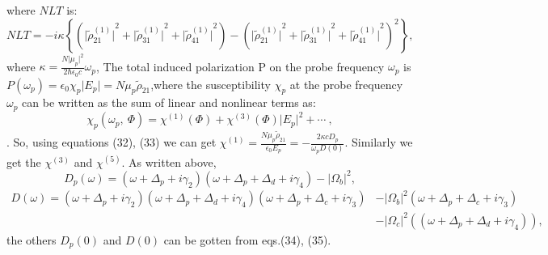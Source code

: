\documentclass[12pt,a4paper]{article}
\begin{document}
where \(NLT\) is:
\begin{equation}
      {NLT} =  {-i\kappa}{\left\lbrace{{\left({\vert\tilde\rho^{(1)}_{21}\vert}^{2}+{\vert\tilde\rho^{(1)}_{31}\vert}^{2}+{\vert\tilde\rho^{(1)}_{41}\vert}^{2}\right)}-{\left({\vert\tilde\rho^{(1)}_{21}\vert}^{2}+{\vert\tilde\rho^{(1)}_{31}\vert}^{2}+{\vert\tilde\rho^{(1)}_{41}\vert}^{2}\right)}^2}\right\rbrace},
\end{equation}
where \(\kappa=\frac{N\vert\mu_p\vert^2}{2\hbar\epsilon_0c}\omega_p\), The total induced polarization P on the probe frequency \(\omega_p\) is \({P}(\omega_p)=\epsilon_0\chi_p\vert E_p\vert=N\mu_p\tilde\rho_{21}\),where the susceptibility \(\chi_p\) at the probe frequency \(\omega_p\) can be written as the sum of linear and nonlinear terms as:
\begin{equation}
    \chi_p(\omega_p,\ \Phi)=\chi^{(1)}(\Phi)+\chi^{(3)}(\Phi)\vert E_p\vert^2+\cdots \ ,
\end{equation}.
So, using equations (32), (33) we can get \(\chi^{(1)}=\frac{N\mu_p\tilde\rho_{21}}{\epsilon_0E_p}=-\frac{2\kappa cD_p}{\omega_p D(0)}\). Similarly we get the \(\chi^{(3)}\) and \(\chi^{(5)}\).
As written above, 
\begin{equation}
    D_p(\omega)=(\omega+\Delta_p+i\gamma_2)(\omega+\Delta_p+\Delta_d+i\gamma_4)-|\Omega_b|^2,
\end{equation}
\begin{align}
    D(\omega)=(\omega+\Delta_p+i\gamma_2)(\omega+\Delta_p+\Delta_d+i\gamma_4)(\omega+\Delta_p+\Delta_c+i\gamma_3)&-|\Omega_b|^2(\omega+\Delta_p+\Delta_c+i\gamma_3)\nonumber\\ &-|\Omega_c|^2((\omega+\Delta_p+\Delta_d+i\gamma_4)),
\end{align}
the others \(D_p(0)\) and \(D(0)\) can be gotten from eqs.(34), (35). 
\newpage
\end{document}
